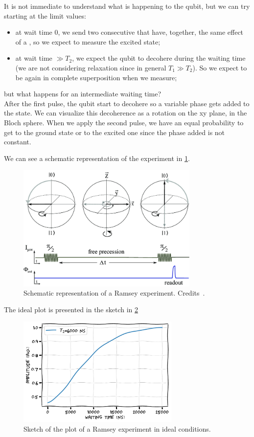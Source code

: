 It is not immediate to understand what is happening to the qubit, but we can try starting at the limit values:
\begin{itemize}
    \item at wait time $0$, we send two consecutive \pihpulse that have, together, the same effect of a \pipulse, so we expect to measure the excited state;
    \item at wait time $\gg T_2$, we expect the qubit to decohere during the waiting time (we are not considering relaxation since in general $T_1\gg T_2$). So we expect to be again in complete superposition when we measure;
\end{itemize}

but what happens for an intermediate waiting time?\\
After the first pulse, the qubit start to decohere so a variable phase gets added to the state.
We can visualize this decoherence as a rotation on the xy plane, in the Bloch sphere.
When we apply the second pulse, we have an equal probability to get to the ground state or to the excited one since the phase added is not constant.

We can see a schematic representation of the experiment in \cref{fig:ramsey_experiment}.
\begin{figure}[ht]
    \centering
    \includegraphics[width=0.8\textwidth]{characterization/figures/ramsey_experiment.png}
    \caption{Schematic representation of a Ramsey experiment. Credits~\cite{ramsey_experiment}.}
    \label{fig:ramsey_experiment}
\end{figure}

The ideal plot is presented in the sketch in \cref{fig:ideal_ramsey_sketch}

\begin{figure}[ht]
    \centering
    \includegraphics[width=8cm]{characterization/figures/ramsey_sketch.pdf}
    \caption{Sketch of the plot of a Ramsey experiment in ideal conditions.}
    \label{fig:ideal_ramsey_sketch}
\end{figure}

